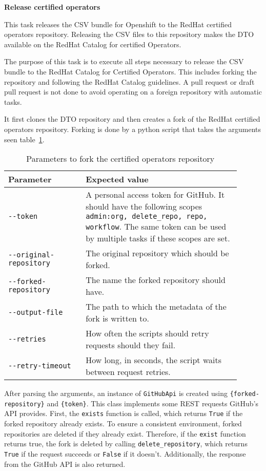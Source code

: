 \textbf{Release certified operators}

This task releases the CSV bundle for Openshift to the RedHat certified operators repository.
Releasing the CSV files to this repository makes the DTO available on the RedHat Catalog for certified Operators.

The purpose of this task is to execute all steps necessary to release the CSV bundle to the RedHat Catalog for Certified Operators.
This includes forking the repository and following the RedHat Catalog guidelines.
A pull request or draft pull request is not done to avoid operating on a foreign repository with automatic tasks.

It first clones the DTO repository and then creates a fork of the RedHat certified operators repository.
Forking is done by a python script that takes the arguments seen table~\ref{tab:parameters-to-fork-the-certified-operators-repository}.

\begin{table}[H]
    \centering
    \caption{Parameters to fork the certified operators repository}
    \label{tab:parameters-to-fork-the-certified-operators-repository}
    \begin{tabular}{|p{0.3\linewidth}|p{0.6\linewidth}}
        Parameter & Expected value \\
        \hline
        \verb|--token| & A personal access token for GitHub.
            It should have the following scopes \verb|admin:org, delete_repo, repo, workflow|.
            The same token can be used by multiple tasks if these scopes are set. \\
        \verb|--original-repository| & The original repository which should be forked. \\
        \verb|--forked-repository| & The name the forked repository should have. \\
        \verb|--output-file| & The path to which the metadata of the fork is written to. \\
        \verb|--retries| & How often the scripts should retry requests should they fail. \\
        \verb|--retry-timeout| & How long, in seconds, the script waits between request retries. \\
    \end{tabular}
\end{table}

After parsing the arguments, an instance of \verb|GitHubApi| is created using \verb|{forked-repository}| and \verb|{token}|.
This class implements some REST requests GitHub's API provides.
First, the \verb|exists| function is called, which returns \verb|True| if the forked repository already exists.
To ensure a consistent environment, forked repositories are deleted if they already exist.
Therefore, if the \verb|exist| function returns true, the fork is deleted by calling \verb|delete_repository|, which returns \verb|True| if the request succeeds or \verb|False| if it doesn't.
Additionally, the response from the GitHub API is also returned.

